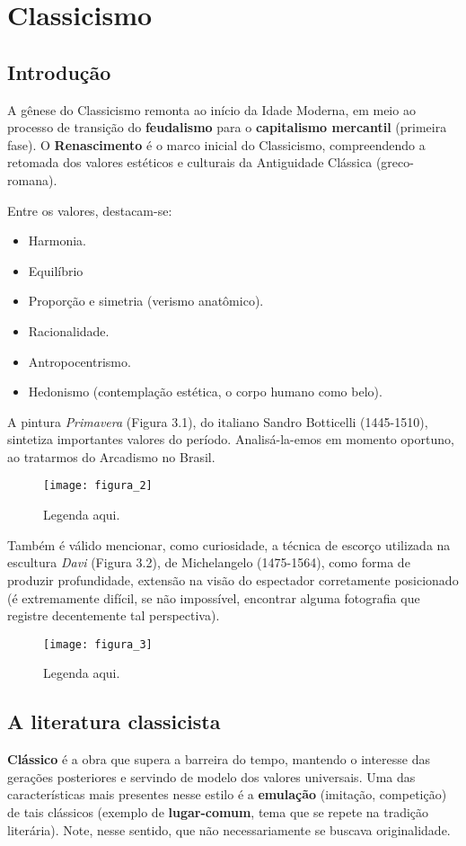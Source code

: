 \documentclass[12pt]{book}
\begin{document}
	\part{Classicismo}
	
		\chapter{Introdução}
 		\par A gênese do Classicismo remonta ao início da Idade Moderna, em meio ao processo de transição do \textbf{feudalismo} para o \textbf{capitalismo mercantil} (primeira fase). O \textbf{Renascimento} é o marco inicial do Classicismo, compreendendo a retomada dos valores estéticos e culturais da Antiguidade Clássica (greco-romana).
 		\par Entre os valores, destacam-se:
 		\begin{itemize}
 			\item Harmonia.
 			\item Equilíbrio
 			\item Proporção e simetria (verismo anatômico).
 			\item Racionalidade.
 			\item Antropocentrismo.
 			\item Hedonismo (contemplação estética, o corpo humano como belo).
 		\end{itemize}
 		\par A pintura \textit{Primavera} (Figura 3.1), do italiano Sandro Botticelli (1445-1510), sintetiza importantes valores do período. Analisá-la-emos em momento oportuno, ao tratarmos do Arcadismo no Brasil. 
 		\begin{figure}[h]
 			\centering
 			\texttt{[image: figura\_2]}
 			\caption{Legenda aqui.}
 			\label{fig:mesh2}
 		\end{figure}
 		\par Também é válido mencionar, como curiosidade, a técnica de escorço utilizada na escultura \textit{Davi} (Figura 3.2), de Michelangelo (1475-1564), como forma de produzir profundidade, extensão na visão do espectador corretamente posicionado (é extremamente difícil, se não impossível, encontrar alguma fotografia que registre decentemente tal perspectiva).
 		\begin{figure}[h]
 			\centering
 			\texttt{[image: figura\_3]}
 			\caption{Legenda aqui.}
 			\label{fig:mesh3}
 		\end{figure}

 		\chapter{A literatura classicista}
 		\par \textbf{Clássico} é a obra que supera a barreira do tempo, mantendo o interesse das gerações posteriores e servindo de modelo dos valores universais. Uma das características mais presentes nesse estilo é a \textbf{emulação} (imitação, competição) de tais clássicos (exemplo de \textbf{lugar-comum}, tema que se repete na tradição literária). Note, nesse sentido, que não necessariamente se buscava originalidade.
 		
\end{document}
